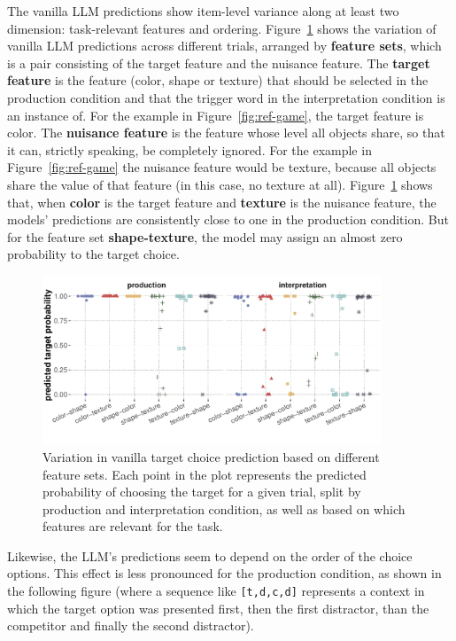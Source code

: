 \documentclass{article}
\begin{document}
The vanilla LLM predictions show item-level variance along at least two dimension: task-relevant features and ordering.
Figure~\ref{fig:feature-set-variation} shows the variation of vanilla LLM predictions across different trials, arranged by \textbf{feature sets}, which is a pair consisting of the target feature and the nuisance feature.
The \textbf{target feature} is the feature (color, shape or texture) that should be selected in the production condition and that the trigger word in the interpretation condition is an instance of.
For the example in Figure~\ref{fig:ref-game}, the target feature is color.
The \textbf{nuisance feature} is the feature whose level all objects share, so that it can, strictly speaking, be completely ignored.
For the example in Figure~\ref{fig:ref-game} the nuisance feature would be texture, because all objects share the value of that feature (in this case, no texture at all).
Figure~\ref{fig:feature-set-variation} shows that, when \textbf{color} is the target feature and \textbf{texture} is the nuisance feature, the models' predictions are consistently close to one in the production condition.
But for the feature set \textbf{shape-texture}, the model may assign an almost zero probability to the target choice.

\begin{figure}
  \centering
  \includegraphics[width=0.9\textwidth]{00-pics/feature-set-variation.pdf}
  \caption{
    Variation in vanilla target choice prediction based on different feature sets.
    Each point in the plot represents the predicted probability of choosing the target for a given trial, split by production and interpretation condition, as well as based on which features are relevant for the task.}
  \label{fig:feature-set-variation}
\end{figure}

\bigskip

Likewise, the LLM's predictions seem to depend on the order of the choice options.
This effect is less pronounced for the production condition, as shown in the following figure (where a sequence like \texttt{[t,d,c,d]} represents a context in which the target option was presented first, then the first distractor, than the competitor and finally the second distractor).
\end{document}
